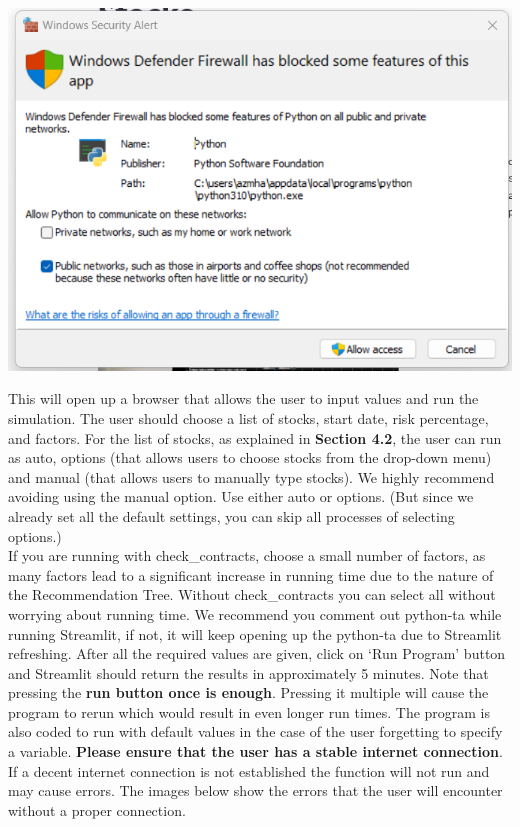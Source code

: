 \documentclass[fontsize=11pt]{article}
\begin{document}
\begin{center}
\includegraphics[scale=0.5]{firewall.png}
\end{center}
This will open up a browser that allows the user to input values and run the simulation. The user should choose a list of stocks, start date, risk percentage, and factors. For the list of stocks, as explained in \textbf{Section 4.2}, the user can run as auto, options (that allows users to choose stocks from the drop-down menu) and manual (that allows users to manually type stocks). We highly recommend avoiding using the manual option. Use either auto or options. (But since we already set all the default settings, you can skip all processes of selecting options.)\\If you are running with check\_contracts, choose a small number of factors, as many factors lead to a significant increase in running time due to the nature of the Recommendation Tree. Without check\_contracts you can select all without worrying about running time. We recommend you comment out python-ta while running Streamlit, if not, it will keep opening up the python-ta due to Streamlit refreshing. After all the required values are given, click on `Run Program' button and Streamlit should return the results in approximately 5 minutes. Note that pressing the \textbf{run button once is enough}. Pressing it multiple will cause the program to rerun which would result in even longer run times. The program is also coded to run with default values in the case of the user forgetting to specify a variable. \textbf{Please ensure that the user has a stable internet connection}. If a decent internet connection is not established the function will not run and may cause errors. The images below show the errors that the user will encounter without a proper connection. 
\end{document}
